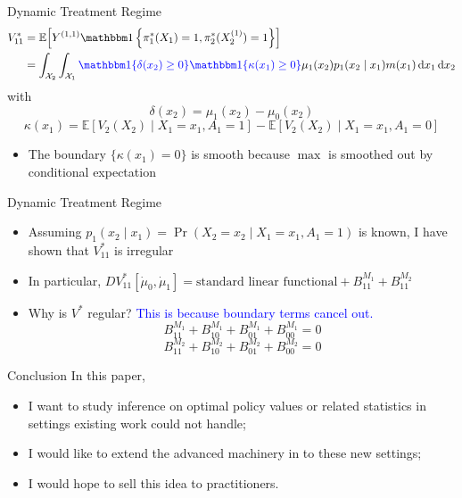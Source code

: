 \documentclass[aspectratio=169,xcolor=dvipsnames]{beamer}
\begin{document}
\begin{frame}{Dynamic Treatment Regime}
    \begin{align*}
        V^*_{11} &= \mathbb E\!\left[
                Y^{(1,1)}
                \mathbbm 1\left\{\pi_1^*(X_1)=1,\pi_2^*(X^{(1)}_2)=1\right\}
                \right]\\
        &=
        \int_{\mathcal X_2}
        \int_{\mathcal X_1}
        \textcolor{blue}{\mathbbm 1\{\delta(x_2)\geq 0\}
        \mathbbm 1\{\kappa(x_1)\geq 0\}}
        \mu_1(x_2)p_1(x_2\mid x_1)m(x_1)\,\mathrm dx_1\,\mathrm dx_2
    \end{align*}
    with 
    \[
    \delta(x_2) = \mu_1(x_2) - \mu_0(x_2)
    \]
    \[
    \kappa(x_1) = \mathbb{E}[V_2(X_2) \mid X_1 = x_1, A_1 = 1] - \mathbb{E}[V_2(X_2) \mid X_1 = x_1, A_1 = 0]
    \]
    \begin{itemize}
        \item The boundary $\{\kappa(x_1) = 0\}$ is smooth because $\max$ is smoothed out by conditional expectation
    \end{itemize}
\end{frame}

\begin{frame}{Dynamic Treatment Regime}
    \begin{itemize}
        \item Assuming $p_1(x_2 \mid x_1) = \Pr(X_2 = x_2 \mid X_1 =x_1, A_1 = 1)$ is known, I have shown that $V^*_{11}$ is irregular

        \bigskip

        \item In particular, $DV^*_{11}[\dot{\mu}_0, \dot{\mu}_1] = \text{standard linear functional} + B_{11}^{M_1} + B_{11}^{M_2}$

        \bigskip

        \item Why is $V^*$ regular? \textcolor{blue}{This is because boundary terms cancel out.}
            \[
            B_{11}^{M_1} +  B_{10}^{M_1} + B_{01}^{M_1} + B_{00}^{M_1} = 0
            \]
            \[
            B_{11}^{M_2} +  B_{10}^{M_2} + B_{01}^{M_2} + B_{00}^{M_2} = 0            
            \]
    \end{itemize}
\end{frame}

\begin{frame}{Conclusion}
    In this paper,
    \begin{itemize}
        \item I want to study inference on optimal policy values or related statistics in settings existing work could not handle;
        \bigskip
        \item I would like to extend the advanced machinery in \citet*{chen2025inference} to these new settings;
        \bigskip
        \item I would hope to sell this idea to practitioners.
    \end{itemize}
\end{frame}
\end{document}
